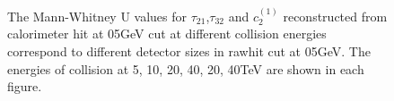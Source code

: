 \documentclass[final,1p,11pt]{elsarticle}
\begin{document}
\begin{figure}
\begin{center}
\end{center}
\caption{The Mann-Whitney U values for $\tau_{21}$,$\tau_{32}$ and $c_2^{(1)}$ reconstructed from calorimeter hit at 05GeV cut at different collision energies correspond to different detector sizes in rawhit cut at 05GeV. The energies of collision at 5, 10, 20, 40, 20, 40TeV are shown in each figure.}
\label{fig:raw_U_summary}
\end{figure}
\end{document}
